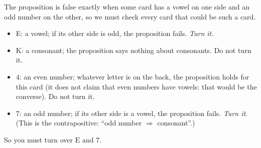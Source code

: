 The proposition is false exactly when some card has a vowel on one side and an odd number on the other, so we must check every card that could be such a card.
\begin{itemize}
\item E: a vowel; if its other side is odd, the proposition fails. \emph{Turn it.}
\item K: a consonant; the proposition says nothing about consonants. Do not turn it.
\item $4$: an even number; whatever letter is on the back, the proposition holds for this card (it does not claim that even numbers have vowels: that would be the converse). Do not turn it.
\item $7$: an odd number; if its other side is a vowel, the proposition fails. \emph{Turn it.} (This is the contrapositive: ``odd number $\Rightarrow$ consonant''.)
\end{itemize}
So you must turn over $\boxed{\text{E and }7}$.
